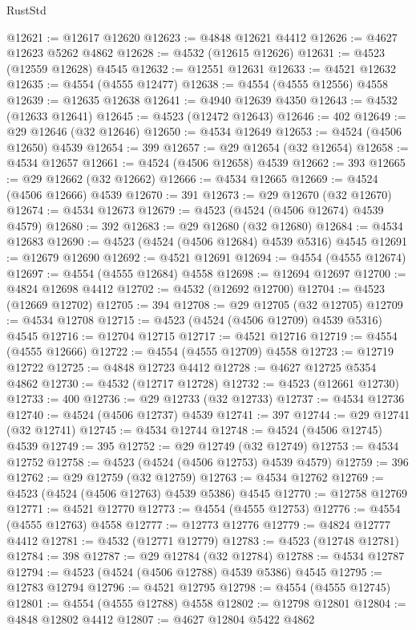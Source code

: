 \begin{lexlean}{RustStd}
\begin{coremodule}
@12621 := @12617 @12620
@12623 := @4848 @12621 @4412
@12626 := @4627 @12623 @5262 @4862
@12628 := @4532 (@12615 @12626)
@12631 := @4523 (@12559 @12628) @4545
@12632 := @12551 @12631
@12633 := @4521 @12632
@12635 := @4554 (@4555 @12477)
@12638 := @4554 (@4555 @12556) @4558
@12639 := @12635 @12638
@12641 := @4940 @12639 @4350
@12643 := @4532 (@12633 @12641)
@12645 := @4523 (@12472 @12643)
@12646 := 402
@12649 := @29 @12646 (@32 @12646)
@12650 := @4534 @12649
@12653 := @4524 (@4506 @12650) @4539
@12654 := 399
@12657 := @29 @12654 (@32 @12654)
@12658 := @4534 @12657
@12661 := @4524 (@4506 @12658) @4539
@12662 := 393
@12665 := @29 @12662 (@32 @12662)
@12666 := @4534 @12665
@12669 := @4524 (@4506 @12666) @4539
@12670 := 391
@12673 := @29 @12670 (@32 @12670)
@12674 := @4534 @12673
@12679 := @4523 (@4524 (@4506 @12674) @4539 @4579)
@12680 := 392
@12683 := @29 @12680 (@32 @12680)
@12684 := @4534 @12683
@12690 := @4523 (@4524 (@4506 @12684) @4539 @5316) @4545
@12691 := @12679 @12690
@12692 := @4521 @12691
@12694 := @4554 (@4555 @12674)
@12697 := @4554 (@4555 @12684) @4558
@12698 := @12694 @12697
@12700 := @4824 @12698 @4412
@12702 := @4532 (@12692 @12700)
@12704 := @4523 (@12669 @12702)
@12705 := 394
@12708 := @29 @12705 (@32 @12705)
@12709 := @4534 @12708
@12715 := @4523 (@4524 (@4506 @12709) @4539 @5316) @4545
@12716 := @12704 @12715
@12717 := @4521 @12716
@12719 := @4554 (@4555 @12666)
@12722 := @4554 (@4555 @12709) @4558
@12723 := @12719 @12722
@12725 := @4848 @12723 @4412
@12728 := @4627 @12725 @5354 @4862
@12730 := @4532 (@12717 @12728)
@12732 := @4523 (@12661 @12730)
@12733 := 400
@12736 := @29 @12733 (@32 @12733)
@12737 := @4534 @12736
@12740 := @4524 (@4506 @12737) @4539
@12741 := 397
@12744 := @29 @12741 (@32 @12741)
@12745 := @4534 @12744
@12748 := @4524 (@4506 @12745) @4539
@12749 := 395
@12752 := @29 @12749 (@32 @12749)
@12753 := @4534 @12752
@12758 := @4523 (@4524 (@4506 @12753) @4539 @4579)
@12759 := 396
@12762 := @29 @12759 (@32 @12759)
@12763 := @4534 @12762
@12769 := @4523 (@4524 (@4506 @12763) @4539 @5386) @4545
@12770 := @12758 @12769
@12771 := @4521 @12770
@12773 := @4554 (@4555 @12753)
@12776 := @4554 (@4555 @12763) @4558
@12777 := @12773 @12776
@12779 := @4824 @12777 @4412
@12781 := @4532 (@12771 @12779)
@12783 := @4523 (@12748 @12781)
@12784 := 398
@12787 := @29 @12784 (@32 @12784)
@12788 := @4534 @12787
@12794 := @4523 (@4524 (@4506 @12788) @4539 @5386) @4545
@12795 := @12783 @12794
@12796 := @4521 @12795
@12798 := @4554 (@4555 @12745)
@12801 := @4554 (@4555 @12788) @4558
@12802 := @12798 @12801
@12804 := @4848 @12802 @4412
@12807 := @4627 @12804 @5422 @4862

\end{coremodule}
\end{lexlean}
